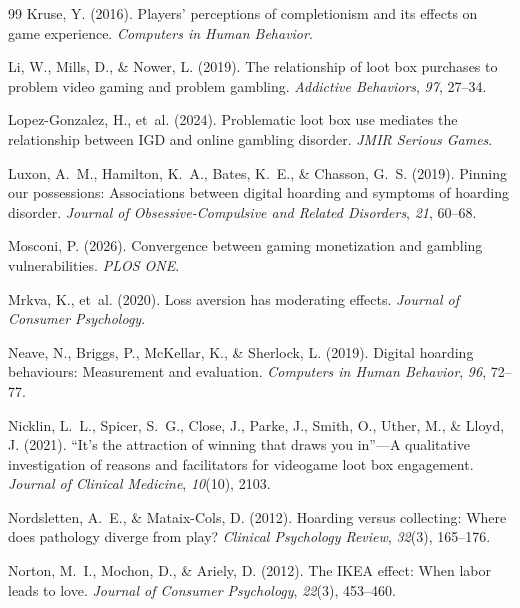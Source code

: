 \documentclass[12pt]{article}
\begin{document}
\begin{thebibliography}{99}
Kruse, Y. (2016).
\newblock Players' perceptions of completionism and its effects on game experience.
\newblock \textit{Computers in Human Behavior}.

Li, W., Mills, D., \& Nower, L. (2019).
\newblock The relationship of loot box purchases to problem video gaming and problem gambling.
\newblock \textit{Addictive Behaviors}, \textit{97}, 27--34.

Lopez-Gonzalez, H., et~al. (2024).
\newblock Problematic loot box use mediates the relationship between IGD and online gambling disorder.
\newblock \textit{JMIR Serious Games}.

Luxon, A.~M., Hamilton, K.~A., Bates, K.~E., \& Chasson, G.~S. (2019).
\newblock Pinning our possessions: Associations between digital hoarding and symptoms of hoarding disorder.
\newblock \textit{Journal of Obsessive-Compulsive and Related Disorders}, \textit{21}, 60--68.

Mosconi, P. (2026).
\newblock Convergence between gaming monetization and gambling vulnerabilities.
\newblock \textit{PLOS ONE}.

Mrkva, K., et~al. (2020).
\newblock Loss aversion has moderating effects.
\newblock \textit{Journal of Consumer Psychology}.

Neave, N., Briggs, P., McKellar, K., \& Sherlock, L. (2019).
\newblock Digital hoarding behaviours: Measurement and evaluation.
\newblock \textit{Computers in Human Behavior}, \textit{96}, 72--77.

Nicklin, L.~L., Spicer, S.~G., Close, J., Parke, J., Smith, O., Uther, M., \& Lloyd, J. (2021).
\newblock ``It's the attraction of winning that draws you in''---A qualitative investigation of reasons and facilitators for videogame loot box engagement.
\newblock \textit{Journal of Clinical Medicine}, \textit{10}(10), 2103.

Nordsletten, A.~E., \& Mataix-Cols, D. (2012).
\newblock Hoarding versus collecting: Where does pathology diverge from play?
\newblock \textit{Clinical Psychology Review}, \textit{32}(3), 165--176.

Norton, M.~I., Mochon, D., \& Ariely, D. (2012).
\newblock The IKEA effect: When labor leads to love.
\newblock \textit{Journal of Consumer Psychology}, \textit{22}(3), 453--460.


\end{thebibliography}
\end{document}
